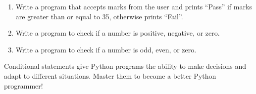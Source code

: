 \begin{enumerate}
    \item Write a program that accepts marks from the user and prints ``Pass'' if marks are greater than or equal to 35, otherwise prints ``Fail''.
    \item Write a program to check if a number is positive, negative, or zero.
    \item Write a program to check if a number is odd, even, or zero.
\end{enumerate}

Conditional statements give Python programs the ability to make decisions and adapt to different situations. Master them to become a better Python programmer!
